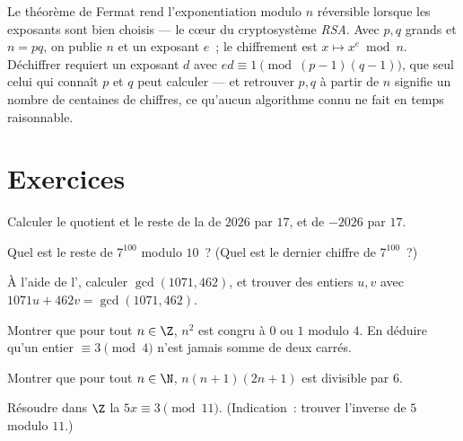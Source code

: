 \begin{example}\label{ex:g12:arith:rsa}
Le théorème de Fermat rend l'exponentiation modulo $n$ réversible lorsque
les exposants sont bien choisis --- le cœur du cryptosystème \emph{RSA}.
Avec $p, q$ grands  et $n = pq$, on publie $n$ et un exposant
$e$~; le chiffrement est $x \mapsto x^e \bmod n$. Déchiffrer requiert un
exposant $d$ avec $ed \equiv 1 \pmod{(p-1)(q-1)}$, que seul celui qui
connaît $p$ et $q$ peut calculer --- et retrouver $p, q$ à partir de $n$
signifie  un nombre de centaines de chiffres, ce qu'aucun
algorithme connu ne fait en temps raisonnable.
\end{example}

\section{Exercices}

\begin{exercise}[$\star$]\label{exo:g12:arith:1}
Calculer le quotient et le reste de la  de $2026$ par
$17$, et de $-2026$ par $17$.
\end{exercise}

\begin{exercise}[$\star$]\label{exo:g12:arith:2}
Quel est le reste de $7^{100}$ modulo $10$~? (Quel est le dernier chiffre de
$7^{100}$~?)
\end{exercise}

\begin{exercise}[$\star$]\label{exo:g12:arith:3}
À l'aide de l', calculer $\gcd(1071, 462)$, et trouver
des entiers $u, v$ avec $1071u + 462v = \gcd(1071, 462)$.
\end{exercise}

\begin{exercise}[$\star$]\label{exo:g12:arith:4}
Montrer que pour tout $n \in \Z$, $n^2$ est congru à $0$ ou $1$ modulo
$4$. En déduire qu'un entier $\equiv 3 \pmod 4$ n'est jamais somme de deux
carrés.
\end{exercise}

\begin{exercise}[$\star\star$]\label{exo:g12:arith:5}
Montrer que pour tout $n \in \N$, $n(n+1)(2n+1)$ est divisible par $6$.
\end{exercise}

\begin{exercise}[$\star\star$]\label{exo:g12:arith:6}
Résoudre dans $\Z$ la  $5x \equiv 3 \pmod{11}$.
(Indication~: trouver l'inverse de $5$ modulo $11$.)
\end{exercise}

